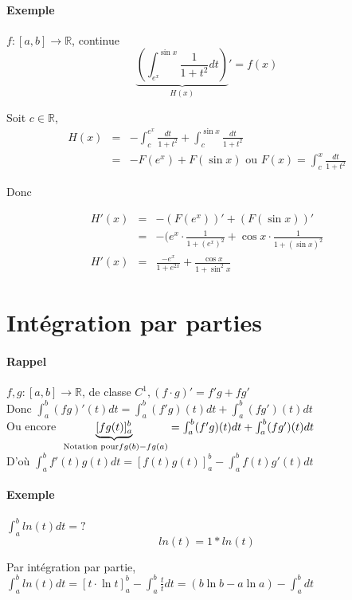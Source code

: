 	\paragraph{Exemple} $f:[a, b] \rightarrow \mathbb{R}$, continue \[\underbrace{(\int_{e^x}^{\sin x} \frac{1}{1+t^2} dt)}_{H(x)}' = f(x)\]

	Soit $c \in \mathbb{R}$, \[\begin{array}{rclr}
		H(x) &=& -\int^{e^x}_c \frac{dt}{1+t^2} + \int_c^{\sin x} \frac{dt}{1+t^2} \\
				   &=& -F(e^x) + F(\sin x) \text{ ou } F(x) = \int_c^x \frac{dt}{1+t^2} \end{array}\]

	\begin{center}
		Donc
	\end{center}
	\[\begin{array}{rcl}
			H'(x) &=& -(F(e^x))' + (F(\sin x))' \\
						   &=& - (e^x \cdot \frac{1}{1+(e^x)^2} + \cos x \cdot \frac{1}{1+(\sin x)^2} \\
	H'(x) &=& \frac{-e^x}{1+e^{2x}} + \frac{\cos x}{1+\sin^2 x} \end{array}\]

			\section{Intégration par parties}

			\paragraph{Rappel} $f, g : [a, b] \rightarrow \mathbb{R}$, de classe $C^1, (f\cdot g)' = f'g+fg'$ ~\\
			Donc $\int_a^b (fg)'(t)dt = \int_a^b(f'g)(t)dt + \int_a^b(fg')(t)dt$ ~\\
			Ou encore ${\underbrace{[fg(t)]^b_a}_{\text{ Notation pour} ~\\ fg(b) - fg(a) } } = \int_a^b(f'g)(t)dt + \int_a^b(fg')(t)dt$ ~\\

			D'où $\int_a^b f'(t)g(t)dt = [f(t)g(t)]_a^b - \int_a^b f(t)g'(t)dt$

			\paragraph{Exemple} $\int_a^b ln(t)dt = ?$ \[ln(t) = 1 * ln(t)\]

		Par intégration par partie, $\int_a^b ln(t)dt = [t\cdot \ln t]^b_a - \int_a^b \frac{t}{t}dt = (b \ln b - a \ln a) - \int_a^b dt$


